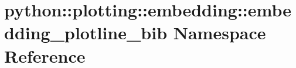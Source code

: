 \hypertarget{namespacepython_1_1plotting_1_1embedding_1_1embedding__plotline__bib}{
\section{python::plotting::embedding::embedding\_\-plotline\_\-bib Namespace Reference}
\label{namespacepython_1_1plotting_1_1embedding_1_1embedding__plotline__bib}
}
